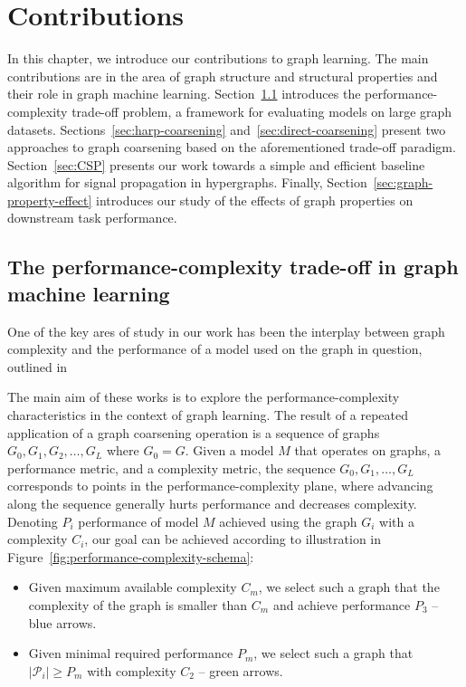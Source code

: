 \chapter{Contributions}
\label{chap:my-research}

In this chapter, we introduce our contributions to graph learning. The main contributions are in the area of graph structure and structural properties and their role in graph machine learning. Section~\ref{sec:performance-complexity} introduces the performance-complexity trade-off problem, a framework for evaluating models on large graph datasets. Sections~\ref{sec:harp-coarsening} and~\ref{sec:direct-coarsening} present two approaches to graph coarsening based on the aforementioned trade-off paradigm. Section~\ref{sec:CSP} presents our work towards a simple and efficient baseline algorithm for signal propagation in hypergraphs. Finally, Section~\ref{sec:graph-property-effect} introduces our study of the effects of graph properties on downstream task performance.

\section{The performance-complexity trade-off in graph machine learning}
\label{sec:performance-complexity}

One of the key ares of study in our work has been the interplay between graph complexity and the performance of a model used on the graph in question, outlined in \cite{prochazka_scalable_2022, dedic_balancing_2023, dedic_balancing_2024}

The main aim of these works is to explore the performance-complexity characteristics in the context of graph learning. The result of a repeated application of a graph coarsening operation is a sequence of graphs \( G_0, G_1, G_2, \dots, G_L \) where \( G_0 = G \).
Given a model \( M \) that operates on graphs, a performance metric, and a complexity metric, the sequence \( G_0, G_1, \dots, G_L \) corresponds to points in the performance-complexity plane, where advancing along the sequence generally hurts performance and decreases complexity. Denoting $P_i$ performance of model $M$ achieved using the graph $G_i$ with a complexity \( C_i \), our goal can be achieved according to illustration in Figure~\ref{fig:performance-complexity-schema}:
\begin{itemize}
	\item Given maximum available complexity $C_m$, we select such a graph that the complexity of the graph is smaller than $C_m$ and achieve performance $P_3$ -- blue arrows.
	\item Given minimal required performance $P_m$, we select such a graph that $|\mathcal{P}_i|\ge P_m$ with complexity $C_2$ -- green arrows.
\end{itemize}


